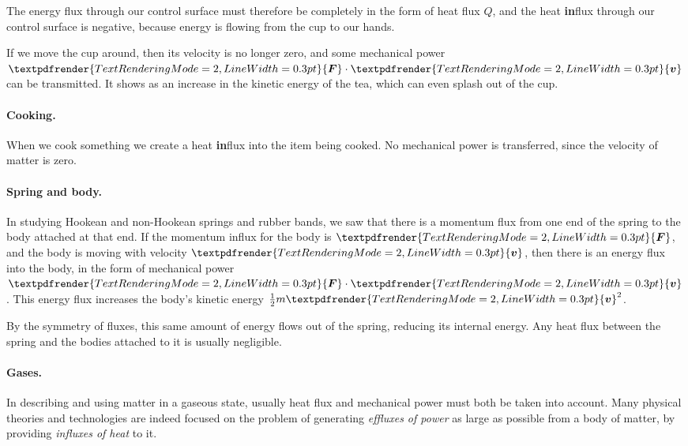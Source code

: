 \documentclass[a4paper,12pt,%
onecolumn,oneside,%
british%
]{memoir}
\renewcommand*{\bm}[1]{\textpdfrender{TextRenderingMode=2,LineWidth=0.3pt}{\boldsymbol{#1}}}
\renewcommand*{\|}[1][]{\nonscript\:#1\vert\nonscript\:\mathopen{}}
\newcommand*{\yv}{\bm{v}}
\newcommand*{\yM}{m}%
\newcommand*{\yQ}{Q}%
\newcommand*{\yF}{\bm{F}}
\begin{document}
The energy flux through our control surface must therefore be completely in the form of heat flux $\yQ$, and the heat \textbf{in}flux through our control surface is negative, because energy is flowing from the cup to our hands.

If we move the cup around, then its velocity is no longer zero, and some mechanical power $\yF\cdot\yv$ can be transmitted. It shows as an increase in the kinetic energy of the tea, which can even splash out of the cup.

\paragraph{Cooking.}
When we cook something we create a heat \textbf{in}flux into the item being cooked. No mechanical power is transferred, since the velocity of matter is zero.

\paragraph{Spring and body.}
In studying Hookean and non-Hookean springs and rubber bands, we saw that there is a momentum flux from one end of the spring to the body attached at that end. If the momentum influx for the body is $\yF$, and the body is moving with velocity $\yv$, then there is an energy flux into the body, in the form of mechanical power $\yF\cdot \yv$. This energy flux increases the body's kinetic energy $\tfrac12\yM\yv^{2}$.

By the symmetry of fluxes, this same amount of energy flows out of the spring, reducing its internal energy. Any heat flux between the spring and the bodies attached to it is usually negligible.

\paragraph{Gases.}

In describing and using matter in a gaseous state, usually heat flux and mechanical power must both be taken into account. Many physical theories and technologies are indeed focused on the problem of generating \emph{effluxes of power} as large as possible from a body of matter, by providing \emph{influxes of heat} to it.
\end{document}
